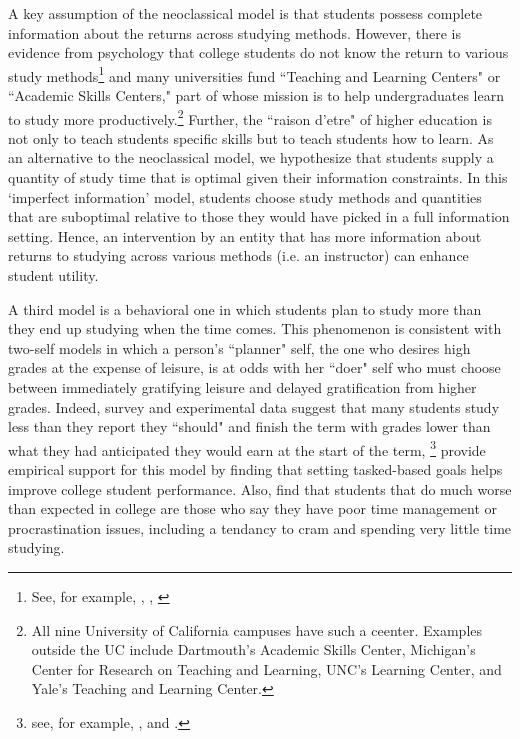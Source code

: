 \documentclass[12pt]{article}
\begin{document}
A key assumption of the neoclassical model is that students possess complete information about the returns across studying methods.  However, there is evidence from psychology that college students do not know the return to various study methods\footnote{See, for example, \textcite{mccabe2011}, \textcite{prcc2007}, \textcite{drmnw2013}} and many universities fund ``Teaching and Learning Centers" or ``Academic Skills Centers," part of whose mission is to help undergraduates learn to study more productively.\footnote{All nine University of California campuses have such a ceenter. Examples outside the UC include Dartmouth's Academic Skills Center, Michigan's Center for Research on Teaching and Learning, UNC's Learning Center, and Yale's Teaching and Learning Center.} Further, the ``raison d'etre" of higher education is not only to teach students specific skills but to teach students how to learn.  As an alternative to the neoclassical model, we hypothesize that students supply a quantity of study time that is optimal given their information constraints. In this `imperfect information' model, students choose study methods and quantities that are suboptimal relative to those they would have picked in a full information setting. Hence, an intervention by an entity that has more information about returns to studying across various methods (i.e. an instructor) can enhance student utility. 

A third model is a behavioral one in which students plan to study more than they end up studying when the time comes. This phenomenon is consistent with two-self models in which a person's ``planner" self, the one who desires high grades at the expense of leisure, is at odds with her ``doer" self who must choose between immediately gratifying leisure and delayed gratification from higher grades.  Indeed, survey and experimental data suggest that many students study less than they report they ``should" and finish the term with grades lower than what they had anticipated they would earn at the start of the term,
\footnote{see, for example, \textcite{ferrari1992},  \textcite{ccog2017} and \textcite{llo2016}.}  \textcite{cgpr2020} provide empirical support for this model by finding that setting tasked-based goals helps improve college student performance. Also, \textcite{blmo2019} find that students that do much worse than expected in college are those who say they have poor time management or procrastination issues, including a tendancy to cram and spending very little time studying.
\end{document}
